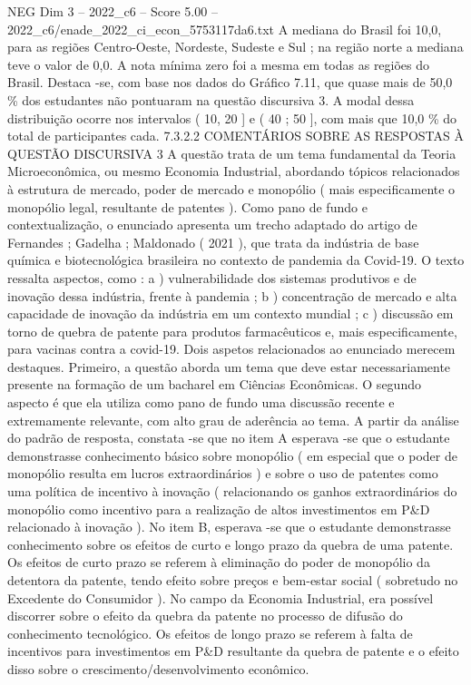 \begin{textsample}{NEG Dim 3 – 2022\_c6 – Score 5.00 – 2022\_c6/enade\_2022\_ci\_econ\_5753117da6.txt}
A mediana do Brasil foi 10,0, para as regiões Centro-Oeste, Nordeste, Sudeste e Sul ; na região norte a mediana teve o valor de 0,0.
A nota mínima zero foi a mesma em todas as regiões do Brasil.
Destaca -se, com base nos dados do Gráfico 7.11, que quase mais de 50,0 \% dos estudantes não pontuaram na questão discursiva 3.
A modal dessa distribuição ocorre nos intervalos ( 10, 20 ] e ( 40 ; 50 ], com mais que 10,0 \% do total de participantes cada. 7.3.2.2 COMENTÁRIOS SOBRE AS RESPOSTAS À QUESTÃO DISCURSIVA 3 A questão trata de um tema fundamental da Teoria Microeconômica, ou mesmo Economia Industrial, abordando tópicos relacionados à estrutura de mercado, poder de mercado e monopólio ( mais especificamente o monopólio legal, resultante de patentes ).
Como pano de fundo e contextualização, o enunciado apresenta um trecho adaptado do artigo de Fernandes ; Gadelha ; Maldonado ( 2021 ), que trata da indústria de base química e biotecnológica brasileira no contexto de pandemia da Covid-19.
O texto ressalta aspectos, como : a ) vulnerabilidade dos sistemas produtivos e de inovação dessa indústria, frente à pandemia ; b ) concentração de mercado e alta capacidade de inovação da indústria em um contexto mundial ; c ) discussão em torno de quebra de patente para produtos farmacêuticos e, mais especificamente, para vacinas contra a covid-19.
Dois aspetos relacionados ao enunciado merecem destaques.
Primeiro, a questão aborda um tema que deve estar necessariamente presente na formação de um bacharel em Ciências Econômicas.
O segundo aspecto é que ela utiliza como pano de fundo uma discussão recente e extremamente relevante, com alto grau de aderência ao tema.
A partir da análise do padrão de resposta, constata -se que no item A esperava -se que o estudante demonstrasse conhecimento básico sobre monopólio ( em especial que o poder de monopólio resulta em lucros extraordinários ) e sobre o uso de patentes como uma política de incentivo à inovação ( relacionando os ganhos extraordinários do monopólio como incentivo para a realização de altos investimentos em P\&D relacionado à inovação ).
No item B, esperava -se que o estudante demonstrasse conhecimento sobre os efeitos de curto e longo prazo da quebra de uma patente.
Os efeitos de curto prazo se referem à eliminação do poder de monopólio da detentora da patente, tendo efeito sobre preços e bem-estar social ( sobretudo no Excedente do Consumidor ).
No campo da Economia Industrial, era possível discorrer sobre o efeito da quebra da patente no processo de difusão do conhecimento tecnológico.
Os efeitos de longo prazo se referem à falta de incentivos para investimentos em P\&D resultante da quebra de patente e o efeito disso sobre o crescimento/desenvolvimento econômico.

\end{textsample}
